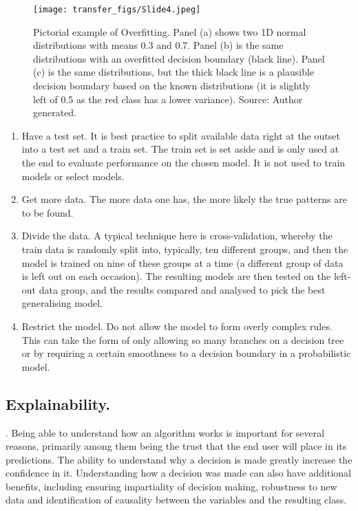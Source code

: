 \begin{figure}
  \texttt{[image: transfer\_figs/Slide4.jpeg]}
  \caption[Pictorial example of Overfitting.]{Pictorial example of Overfitting. Panel (a) shows two 1D normal distributions with means 0.3 and 0.7. Panel (b) is the same distributions with an overfitted decision boundary (black line). Panel (c) is the same distributions, but the thick black line is a plausible decision boundary based on the known distributions (it is slightly left of 0.5 as the red class has a lower variance). Source: Author generated.}
  \label{fig:overfit}
\end{figure}

\begin{enumerate}

\item{Have a test set.} It is best practice to split available data right at the outset into a test set and a train set. The train set is set aside and is only used at the end to evaluate performance on the chosen model. It is not used to train models or select models.

\item{Get more data.} The more data one has, the more likely the true patterns are to be found.

\item{Divide the data.} A typical technique here is cross-validation, whereby the train data is randomly split into, typically, ten different groups, and then the model is trained on nine of these groups at a time (a different group of data is left out on each occasion). The resulting models are then tested on the left-out data group, and the results compared and analysed to pick the best generalising model.

\item{Restrict the model.} Do not allow the model to form overly complex rules. This can take the form of only allowing so many branches on a decision tree or by requiring a certain smoothness to a decision boundary in a probabilistic model.

\end{enumerate} 


\subsection{Explainability.}   \parencite{arrieta2020explainable}. Being able to understand how an algorithm works is important for several reasons, primarily among them being the trust that the end user will place in its predictions. The ability to understand why a decision is made greatly increase the confidence in it. Understanding how a decision was made can also have additional benefits, including ensuring impartiality of decision making, robustness to new data and identification of causality between the variables and the resulting class.

